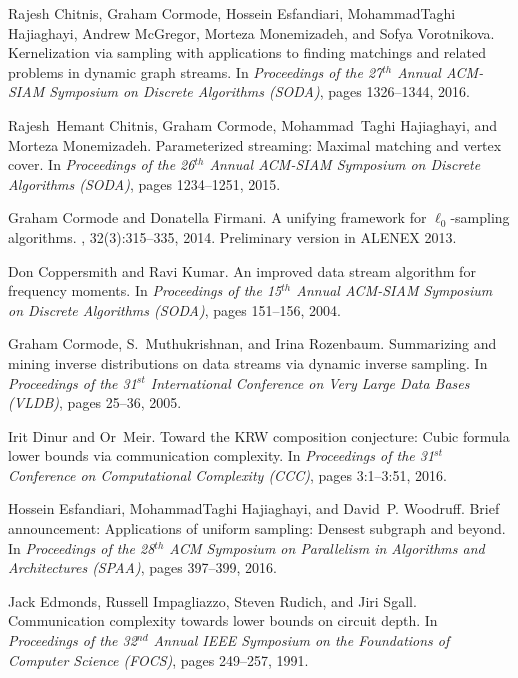 \documentclass[11pt]{article}
\begin{document}
\begin{thebibliography}{GMWW14}
Rajesh Chitnis, Graham Cormode, Hossein Esfandiari, MohammadTaghi Hajiaghayi,
  Andrew McGregor, Morteza Monemizadeh, and Sofya Vorotnikova.
\newblock Kernelization via sampling with applications to finding matchings and
  related problems in dynamic graph streams.
\newblock In {\em Proceedings of the 27$^{th}$ Annual {ACM-SIAM} Symposium on
  Discrete Algorithms (SODA)}, pages 1326--1344, 2016.

Rajesh~Hemant Chitnis, Graham Cormode, Mohammad~Taghi Hajiaghayi, and Morteza
  Monemizadeh.
\newblock Parameterized streaming: Maximal matching and vertex cover.
\newblock In {\em Proceedings of the 26$^{th}$ Annual {ACM-SIAM} Symposium on
  Discrete Algorithms (SODA)}, pages 1234--1251, 2015.

Graham Cormode and Donatella Firmani.
\newblock A unifying framework for $\ell_0$-sampling algorithms.
, 32(3):315--335, 2014.
\newblock Preliminary version in ALENEX 2013.

Don Coppersmith and Ravi Kumar.
\newblock An improved data stream algorithm for frequency moments.
\newblock In {\em Proceedings of the 15$^{th}$ Annual {ACM-SIAM} Symposium on
  Discrete Algorithms (SODA)}, pages 151--156, 2004.

Graham Cormode, S.~Muthukrishnan, and Irina Rozenbaum.
\newblock Summarizing and mining inverse distributions on data streams via
  dynamic inverse sampling.
\newblock In {\em Proceedings of the 31$^{st}$ International Conference on Very
  Large Data Bases (VLDB)}, pages 25--36, 2005.

Irit Dinur and Or~Meir.
\newblock Toward the {KRW} composition conjecture: Cubic formula lower bounds
  via communication complexity.
\newblock In {\em Proceedings of the 31$^{st}$ Conference on Computational
  Complexity (CCC)}, pages 3:1--3:51, 2016.

Hossein Esfandiari, MohammadTaghi Hajiaghayi, and David~P. Woodruff.
\newblock Brief announcement: Applications of uniform sampling: Densest
  subgraph and beyond.
\newblock In {\em Proceedings of the 28$^{th}$ {ACM} Symposium on Parallelism
  in Algorithms and Architectures (SPAA)}, pages 397--399, 2016.

Jack Edmonds, Russell Impagliazzo, Steven Rudich, and Jiri Sgall.
\newblock Communication complexity towards lower bounds on circuit depth.
\newblock In {\em Proceedings of the 32$^{nd}$ Annual IEEE Symposium on the
  Foundations of Computer Science (FOCS)}, pages 249--257, 1991.


\end{thebibliography}
\end{document}
